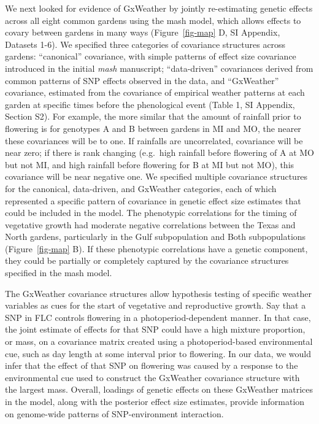 \documentclass[
  9pt,
  twocolumn,
  twoside]{pnas-new}
\begin{document}
We next looked for evidence of GxWeather by jointly re-estimating
genetic effects across all eight common gardens using the mash model,
which allows effects to covary between gardens in many ways
(Figure~\ref{fig-map} D, SI Appendix, Datasets 1-6). We specified three
categories of covariance structures across gardens: ``canonical''
covariance, with simple patterns of effect size covariance introduced in
the initial \emph{mash} manuscript; ``data-driven'' covariances derived
from common patterns of SNP effects observed in the data, and
``GxWeather'' covariance, estimated from the covariance of empirical
weather patterns at each garden at specific times before the
phenological event (Table 1, SI Appendix, Section S2). For example, the
more similar that the amount of rainfall prior to flowering is for
genotypes A and B between gardens in MI and MO, the nearer these
covariances will be to one. If rainfalls are uncorrelated, covariance
will be near zero; if there is rank changing (e.g.~high rainfall before
flowering of A at MO but not MI, and high rainfall before flowering for
B at MI but not MO), this covariance will be near negative one. We
specified multiple covariance structures for the canonical, data-driven,
and GxWeather categories, each of which represented a specific pattern
of covariance in genetic effect size estimates that could be included in
the model. The phenotypic correlations for the timing of vegetative
growth had moderate negative correlations between the Texas and North
gardens, particularly in the Gulf subpopulation and Both subpopulations
(Figure~\ref{fig-map} B). If these phenotypic correlations have a
genetic component, they could be partially or completely captured by the
covariance structures specified in the mash model.

The GxWeather covariance structures allow hypothesis testing of specific
weather variables as cues for the start of vegetative and reproductive
growth. Say that a SNP in FLC controls flowering in a
photoperiod-dependent manner. In that case, the joint estimate of
effects for that SNP could have a high mixture proportion, or mass, on a
covariance matrix created using a photoperiod-based environmental cue,
such as day length at some interval prior to flowering. In our data, we
would infer that the effect of that SNP on flowering was caused by a
response to the environmental cue used to construct the GxWeather
covariance structure with the largest mass. Overall, loadings of genetic
effects on these GxWeather matrices in the model, along with the
posterior effect size estimates, provide information on genome-wide
patterns of SNP-environment interaction.
\end{document}
